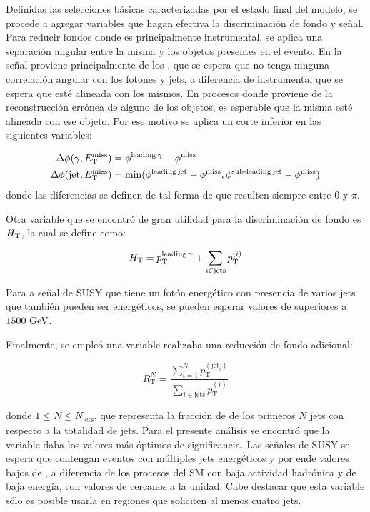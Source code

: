 Definidas las selecciones básicas caracterizadas por el estado final del modelo, se procede a agregar variables que hagan efectiva la discriminación de fondo y señal. Para reducir fondos donde \met es principalmente instrumental, se aplica una separación angular entre la misma y los objetos presentes en el evento. En la señal \met proviene principalmente de los \gravino, que se espera que no tenga ninguna correlación angular con los fotones y jets, a diferencia de \met instrumental que se espera que esté alineada con los mismos. En procesos donde \met proviene de la reconstrucción errónea de alguno de los objetos, es esperable que la misma esté alineada con ese objeto. Por ese motivo se aplica un corte inferior en las siguientes variables:

\begin{equation}
  \begin{split}
  \Delta\phi(\gamma, E_{\text{T}}^{\text{miss}}) & = \phi^{\text{leading}\: \gamma} - \phi^{\text{miss}} \\
  \Delta\phi(\text{jet}, E_{\text{T}}^{\text{miss}}) & = \text{min}(\phi^{\text{leading}\: \text{jet}} - \phi^{\text{miss}}, \phi^{\text{sub-leading}\: \text{jet}} - \phi^{\text{miss}}) \\
  \end{split}
\end{equation}
% 
donde las diferencias se definen de tal forma de que resulten siempre entre $0$ y $\pi$.

Otra variable que se encontró de gran utilidad para la discriminación de fondo es $H_{\text{T}}$, la cual se define como:

\begin{equation}
  H_{\text{T}} = p_{\text{T}}^{\text{leading}\: \gamma} + \sum_{i \in \text{jets}} p_{\text{T}}^{(i)}
\end{equation}

Para a señal de SUSY que tiene un fotón energético con presencia de varios jets que también pueden ser energéticos, se pueden esperar valores de \HT superiores a $1500\ \gev$.

Finalmente, se empleó una variable realizaba una reducción de fondo adicional:

\begin{equation}
  R_{\text{T}}^{N} = \frac{\sum_{i=1}^{N} p_{\text{T}}^{(\text{jet}_i)}}{\sum_{i \in \text{jets}} p_{\text{T}}^{(i)}}
\end{equation}

donde $1\le N \le N_{\text{jets}}$, que representa la fracción de \pt de los primeros $N$ jets con respecto a la totalidad de jets. Para el presente análisis se encontró que la variable \rtf daba los valores más óptimos de significancia. Las señales de SUSY se espera que contengan eventos con múltiples jets energéticos y por ende valores bajos de \rtf, a diferencia de los procesos del SM con baja actividad hadrónica y de baja energía, con valores de \rtf cercanos a la unidad. Cabe destacar que esta variable sólo es posible usarla en regiones que soliciten al menos cuatro jets.

